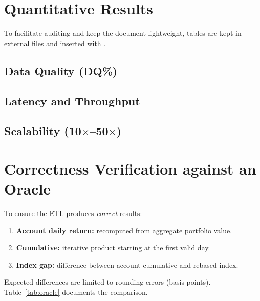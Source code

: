 \documentclass[conference]{IEEEtran}
\begin{document}
\section{Quantitative Results}
To facilitate auditing and keep the document lightweight, tables are kept in external files and inserted with \verb||.

\subsection{Data Quality (DQ\%)}


\subsection{Latency and Throughput}


\subsection{Scalability (10$\times$--50$\times$)}


\section{Correctness Verification against an Oracle}
To ensure the ETL produces \emph{correct} results:
\begin{enumerate}
    \item \textbf{Account daily return:} recomputed from aggregate portfolio value.
    \item \textbf{Cumulative:} iterative product starting at the first valid day.
    \item \textbf{Index gap:} difference between account cumulative and rebased index.
\end{enumerate}
Expected differences are limited to rounding errors (basis points). Table~\ref{tab:oracle} documents the comparison.

\begin{table}[!t]
\centering
\caption{ETL vs.\ Oracle Comparison (computed from Parquet artifacts)}
\label{tab:oracle}
\vspace{-2mm}
\end{table}
\end{document}
